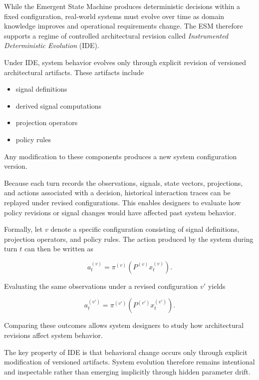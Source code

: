\documentclass[11pt]{article}
\begin{document}
While the Emergent State Machine produces deterministic decisions within a fixed configuration, real-world systems must evolve over time as domain knowledge improves and operational requirements change. The ESM therefore supports a regime of controlled architectural revision called \emph{Instrumented Deterministic Evolution} (IDE).

Under IDE, system behavior evolves only through explicit revision of versioned architectural artifacts. These artifacts include

\begin{itemize}
\item signal definitions
\item derived signal computations
\item projection operators
\item policy rules
\end{itemize}

Any modification to these components produces a new system configuration version.

Because each turn records the observations, signals, state vectors, projections, and actions associated with a decision, historical interaction traces can be replayed under revised configurations. This enables designers to evaluate how policy revisions or signal changes would have affected past system behavior.

Formally, let $v$ denote a specific configuration consisting of signal definitions, projection operators, and policy rules. The action produced by the system during turn $t$ can then be written as

\begin{equation}
a_t^{(v)} = \pi^{(v)}\left(P^{(v)} x_t^{(v)}\right).
\end{equation}

Evaluating the same observations under a revised configuration $v'$ yields

\begin{equation}
a_t^{(v')} = \pi^{(v')}\left(P^{(v')} x_t^{(v')}\right).
\end{equation}

Comparing these outcomes allows system designers to study how architectural revisions affect system behavior.

The key property of IDE is that behavioral change occurs only through explicit modification of versioned artifacts. System evolution therefore remains intentional and inspectable rather than emerging implicitly through hidden parameter drift.
\end{document}
